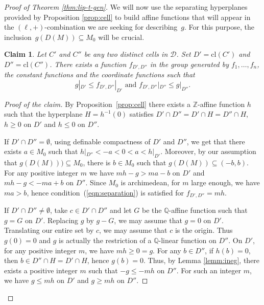 \documentclass[JEP,XML,SOM,Unicode,ThmDefs,NoEqCountersInSection,published]{cedram}
\newcommand{\cl}{\mathrm{cl}}
\newcommand{\Q}{\mathbb Q}
\newcommand{\Z}{\mathbb Z}
\theoremstyle{plain}
\newtheorem{claim}[subsection]{Claim}
\theoremstyle{definition}
\begin{document}
\begin{proof}[Proof of Theorem \ref{thm:lip-t-gen}]
We will now use the separating hyperplanes provided by Proposition \ref{prop:cell}
to build affine functions that will appear in the $(\ell,+)$-combination we are seeking for describing~$g$. For this purpose,
the inclusion~$g(D(M))\subseteq M_0$ will be crucial.

\begin{claim}\label{claim:separation}
Let $C'$ and $C''$ be any two distinct cells in $\mathcal{D}$. Set $D' = \cl (C')$ and $D'' = \cl (C'')$.
There exists a function $f_{D',D''}$ in the group generated by $f_1,\ldots,f_n$, the constant functions and the coordinate functions such that\vspace*{-3pt}
\begin{equation}\label{eqn:separation}\tag{$*$}
g|_{D'}\leq f_{D',D''}|_{D'} \text{ and } f_{D',D''}|_{D''}\leq g|_{D''}.
\end{equation}
\end{claim}

\begin{proof}[Proof of the claim]
By Proposition~\ref{prop:cell} there exists a $\Z$-affine function $h$ such that the hyperplane $H =h^{-1}(0)$ satisfies $D' \cap D'' =D' \cap H=D''\cap H$, $h \geq 0$ on $D'$ and
$h \leq 0$ on $D''$.

If $D'\cap D''=\emptyset$, using definable compactness of $D'$ and $D''$, we get that there exists $a \in M_0$ such that $h|_{D''}<-a<0<a<h|_{D'}$.
Moreover, by our assumption that $g(D(M)))\subseteq M_0$, there is $b\in M_0$ such that $g(D (M)) \subseteq (-b, b)$.
For any positive integer $m$ we have $mh - g > ma - b$ on $D'$ and $mh - g < -ma + b$ on $D''$.
Since $M_0$ is archimedean, for $m$ large enough, we have $ma > b$, hence
condition~(\ref{eqn:separation}) is satisfied for $f_{D',D''} = mh$.

If $D'\cap D''\neq \emptyset$, take $c\in D'\cap D''$ and let $G$ be the $\Q$-affine function such that $g=G$ on $D'$.
Replacing $g$ by $g-G$, we may assume that $g=0$ on $D'$. Translating our entire set by $c$, we may assume that $c$ is the origin. Thus $g(0)=0$
and $g$ is actually the restriction of a $\Q$-linear function on $D''$.
On $D'$, for any positive integer $m$, we have $mh\geq0=g$.
For any $b\in D''$, if $h(b)=0$, then $b\in D''\cap H=D'\cap H$, hence $g(b)=0$.
Thus, by Lemma \ref{lemm:ineg}, there exists a positive integer $m$ such that
$-g \leq -mh$ on $D''$. For such an integer $m$, we have $g \leq mh$ on $D'$ and $g \geq mh$ on $D''$.
\end{proof}


\end{proof}
\end{document}
